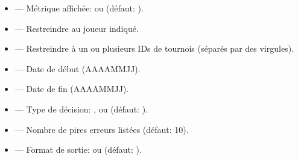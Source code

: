 \documentclass[letterpaper,10pt,french]{sphinxmanual}
\begin{document}
\sphinxAtStartPar
{}
\begin{itemize}
\item {} 
\sphinxAtStartPar
{} — Métrique affichée:  ou  (défaut: ).

\item {} 
\sphinxAtStartPar
{} — Restreindre au joueur indiqué.

\item {} 
\sphinxAtStartPar
{} — Restreindre à un ou plusieurs IDs de tournois (séparés
par des virgules).

\item {} 
\sphinxAtStartPar
{} — Date de début (AAAA\sphinxhyphen{}MM\sphinxhyphen{}JJ).

\item {} 
\sphinxAtStartPar
{} — Date de fin (AAAA\sphinxhyphen{}MM\sphinxhyphen{}JJ).

\item {} 
\sphinxAtStartPar
{} — Type de décision: ,  ou 
(défaut: ).

\item {} 
\sphinxAtStartPar
{} — Nombre de pires erreurs listées (défaut: 10).

\item {} 
\sphinxAtStartPar
{} — Format de sortie:  ou  (défaut: ).

\end{itemize}

\sphinxAtStartPar
{}
\end{document}
